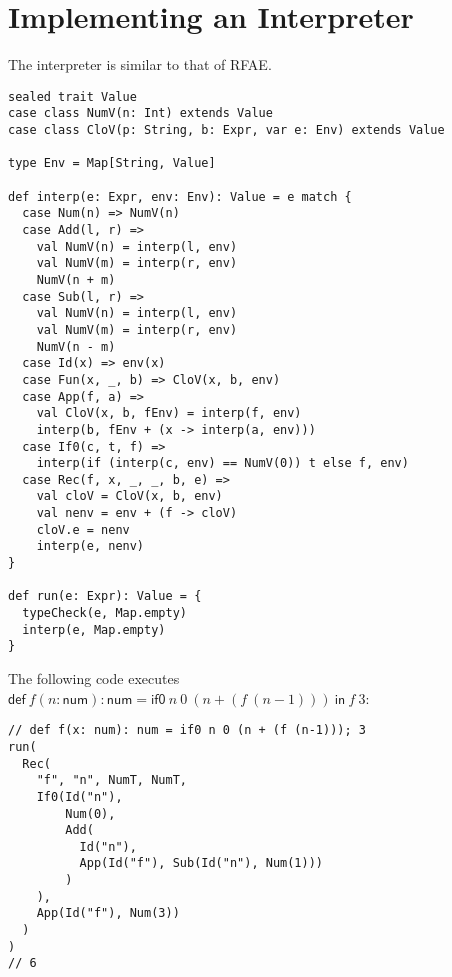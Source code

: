 \section{Implementing an Interpreter}

The interpreter is similar to that of RFAE.

\begin{verbatim}
sealed trait Value
case class NumV(n: Int) extends Value
case class CloV(p: String, b: Expr, var e: Env) extends Value

type Env = Map[String, Value]

def interp(e: Expr, env: Env): Value = e match {
  case Num(n) => NumV(n)
  case Add(l, r) =>
    val NumV(n) = interp(l, env)
    val NumV(m) = interp(r, env)
    NumV(n + m)
  case Sub(l, r) =>
    val NumV(n) = interp(l, env)
    val NumV(m) = interp(r, env)
    NumV(n - m)
  case Id(x) => env(x)
  case Fun(x, _, b) => CloV(x, b, env)
  case App(f, a) =>
    val CloV(x, b, fEnv) = interp(f, env)
    interp(b, fEnv + (x -> interp(a, env)))
  case If0(c, t, f) =>
    interp(if (interp(c, env) == NumV(0)) t else f, env)
  case Rec(f, x, _, _, b, e) =>
    val cloV = CloV(x, b, env)
    val nenv = env + (f -> cloV)
    cloV.e = nenv
    interp(e, nenv)
}

def run(e: Expr): Value = {
  typeCheck(e, Map.empty)
  interp(e, Map.empty)
}
\end{verbatim}

The following code executes $\textsf{def}\ f(n:\textsf{num}):\textsf{num}=\textsf{if0}\ n\ 0\
(n+(f\ (n-1)))\ \textsf{in}\ f\ 3$:

\begin{verbatim}
// def f(x: num): num = if0 n 0 (n + (f (n-1))); 3
run(
  Rec(
    "f", "n", NumT, NumT,
    If0(Id("n"),
        Num(0),
        Add(
          Id("n"),
          App(Id("f"), Sub(Id("n"), Num(1)))
        )
    ),
    App(Id("f"), Num(3))
  )
)
// 6
\end{verbatim}
